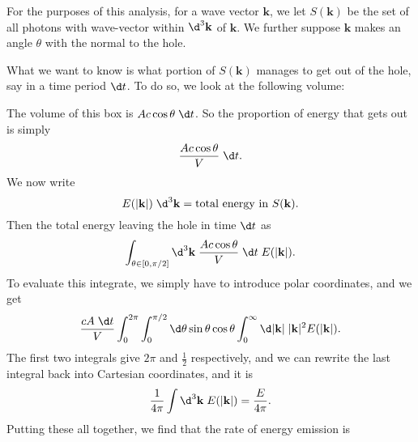 \documentclass[a4paper]{article}
\begin{document}
For the purposes of this analysis, for a wave vector $\mathbf{k}$, we let $S(\mathbf{k})$ be the set of all photons with wave-vector within $\d^3 \mathbf{k}$ of $\mathbf{k}$. We further suppose $\mathbf{k}$ makes an angle $\theta$ with the normal to the hole.
\begin{center}
\end{center}
What we want to know is what portion of $S(\mathbf{k})$ manages to get out of the hole, say in a time period $\d t$. To do so, we look at the following volume:
\begin{center}
\end{center}
The volume of this box is $A c \cos \theta \;\d t$. So the proportion of energy that gets out is simply
\[
  \frac{A c \cos \theta}{V} \;\d t.
\]
We now write
\[
  E(|\mathbf{k}|) \;\d^3 \mathbf{k} = \text{total energy in $S(\mathbf{k})$}.
\]
Then the total energy leaving the hole in time $\d t$ as
\[
  \int_{\theta \in [0, \pi/2]} \d^3 \mathbf{k}\; \frac{A c \cos \theta}{V}\;\d t\; E(|\mathbf{k}|).
\]
To evaluate this integrate, we simply have to introduce polar coordinates, and we get
\[
  \frac{cA \;\d t}{V} \int_0^{2\pi} \int_0^{\pi/2} \d \theta \sin \theta \cos \theta \int_0^\infty \d |\mathbf{k}|\; |\mathbf{k}|^2 E(|\mathbf{k}|).
\]
The first two integrals give $2\pi$ and $\frac{1}{2}$ respectively, and we can rewrite the last integral back into Cartesian coordinates, and it is
\[
  \frac{1}{4\pi}\int \d^3 \mathbf{k}\; E(|\mathbf{k}|) = \frac{E}{4\pi}.
\]
Putting these all together, we find that the rate of energy emission is
\end{document}
